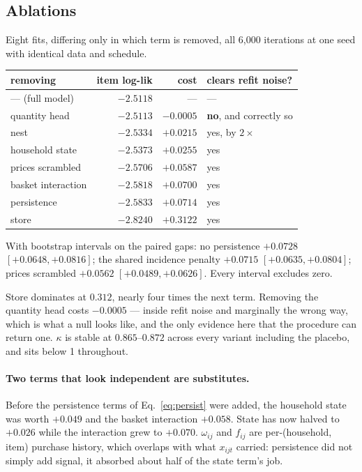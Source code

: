 \documentclass[11pt]{article}
\begin{document}
\subsection{Ablations}
\label{sec:ablate}

Eight fits, differing only in which term is removed, all 6{,}000 iterations at one seed with
identical data and schedule.

\begin{center}
\begin{tabular}{lrrl}
\toprule
removing & item log-lik & cost & clears refit noise? \\
\midrule
--- (full model) & $\mathbf{-2.5118}$ & --- & --- \\
quantity head & $-2.5113$ & $-0.0005$ & \textbf{no}, and correctly so \\
nest & $-2.5334$ & $+0.0215$ & yes, by $2\times$ \\
household state & $-2.5373$ & $+0.0255$ & yes \\
prices scrambled & $-2.5706$ & $+0.0587$ & yes \\
basket interaction & $-2.5818$ & $+0.0700$ & yes \\
persistence & $-2.5833$ & $+0.0714$ & yes \\
store & $-2.8240$ & $+0.3122$ & yes \\
\bottomrule
\end{tabular}
\end{center}

With bootstrap intervals on the paired gaps: no persistence $+0.0728$ $[+0.0648,+0.0816]$;
the shared incidence penalty $+0.0715$ $[+0.0635,+0.0804]$; prices scrambled $+0.0562$
$[+0.0489,+0.0626]$. Every interval excludes zero.

Store dominates at $0.312$, nearly four times the next term. Removing the quantity head
costs $-0.0005$ --- inside refit noise and marginally the wrong way, which is what a null
looks like, and the only evidence here that the procedure can return one. $\kappa$ is stable
at $0.865$--$0.872$ across every variant including the placebo, and sits below 1 throughout.

\paragraph{Two terms that look independent are substitutes.} Before the persistence terms of
Eq.~\ref{eq:persist} were added, the household state was worth $+0.049$ and the basket
interaction $+0.058$. State has now halved to $+0.026$ while the interaction grew to
$+0.070$. $\omega_{ij}$ and $f_{ij}$ are per-(household, item) purchase history, which
overlaps with what $x_{ijt}$ carried: persistence did not simply add signal, it absorbed
about half of the state term's job.
\end{document}
